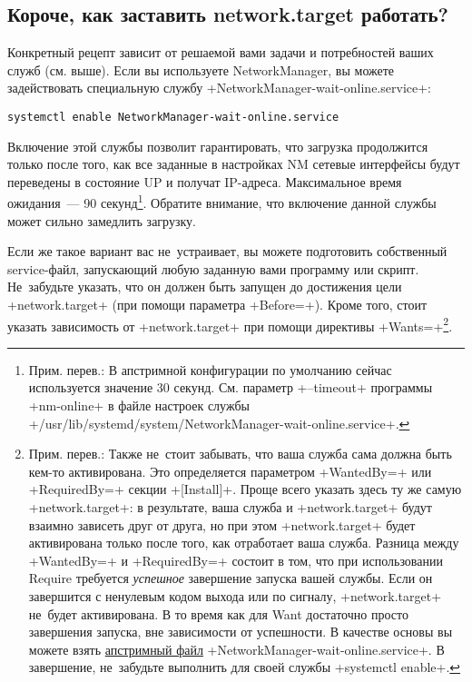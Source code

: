 \documentclass[10pt,oneside,a4paper]{article}
\begin{document}
\subsection*{Короче, как заставить network.target работать?}

Конкретный рецепт зависит от решаемой вами задачи и потребностей ваших служб
(см. выше). Если вы используете NetworkManager, вы можете задействовать
специальную службу +NetworkManager-wait-online.service+:
\begin{Verbatim}
systemctl enable NetworkManager-wait-online.service
\end{Verbatim}

Включение этой службы позволит гарантировать, что загрузка продолжится только
после того, как все заданные в настройках NM сетевые интерфейсы будут переведены
в состояние UP и получат IP-адреса. Максимальное время ожидания~--- 90
секунд\footnote{Прим. перев.: В апстримной конфигурации по умолчанию сейчас
используется значение 30 секунд. См. параметр +--timeout+ программы +nm-online+
в файле настроек службы 
+/usr/lib/systemd/system/NetworkManager-wait-online.service+.}.
Обратите внимание, что включение данной службы может сильно замедлить загрузку.

Если же такое вариант вас не~устраивает, вы можете подготовить собственный
service-файл, запускающий любую заданную вами программу или скрипт. Не~забудьте
указать, что он должен быть запущен до достижения цели +network.target+ (при
помощи параметра +Before=+). Кроме того, стоит указать зависимость от
+network.target+ при помощи директивы +Wants=+\footnote{Прим. перев.: Также
не~стоит забывать, что ваша служба сама должна быть кем-то активирована. Это
определяется параметром +WantedBy=+ или +RequiredBy=+ секции +[Install]+. Проще
всего указать здесь ту же самую +network.target+: в результате, ваша служба и
+network.target+ будут взаимно зависеть друг от друга, но при этом
+network.target+ будет активирована только после того, как отработает ваша
служба. Разница между +WantedBy=+ и +RequiredBy=+ состоит в том, что при
использовании Require требуется \emph{успешное} завершение запуска вашей службы.
Если он завершится с ненулевым кодом выхода или по сигналу, +network.target+
не~будет активирована. В то время как для Want достаточно просто завершения
запуска, вне зависимости от успешности. В качестве основы вы можете взять
\href{http://cgit.freedesktop.org/NetworkManager/NetworkManager/tree/data/NetworkManager-wait-online.service.in}%
{апстримный файл} +NetworkManager-wait-online.service+. В завершение,
не~забудьте выполнить для своей службы +systemctl enable+.}.
\end{document}
